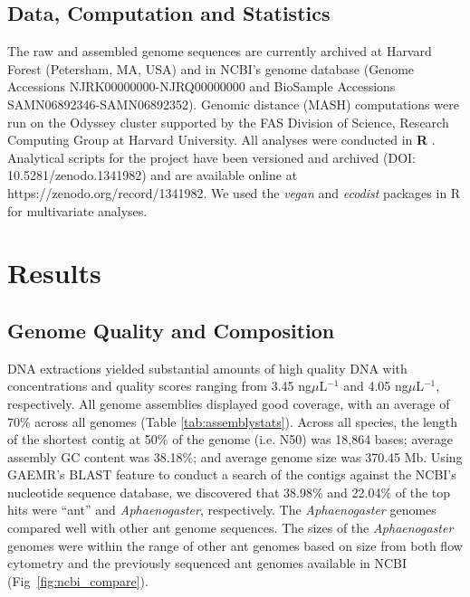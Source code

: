 \documentclass[fleqn,10pt,lineno]{wlpeerj} %
\begin{document}
\subsection*{Data, Computation and Statistics}

The raw and assembled genome sequences are currently archived at
Harvard Forest (Petersham, MA, USA) and in NCBI's genome database
(Genome Accessions NJRK00000000-NJRQ00000000 and BioSample Accessions
SAMN06892346-SAMN06892352). Genomic distance (MASH) computations were
run on the Odyssey cluster supported by the FAS Division of Science,
Research Computing Group at Harvard University. All analyses were
conducted in \textbf{R} \citep{RCoreTeam2017}. Analytical scripts for
the project have been versioned and archived (DOI:
10.5281/zenodo.1341982) and are available online at
https://zenodo.org/record/1341982. We used the \textit{vegan}
\citep{Oksanen2016} and \textit{ecodist} \citep{Goslee2007} packages
in R for multivariate analyses.

\section*{Results}

\subsection*{Genome Quality and Composition}

DNA extractions yielded substantial amounts of high quality DNA with
concentrations and quality scores ranging from 3.45
ng$\mu$L$^{-1}$ and 4.05 ng$\mu$L$^{-1}$,
respectively. All genome assemblies displayed good coverage, with an
average of 70\% across all genomes (Table
\ref{tab:assemblystats}). Across all species, the length of the
shortest contig at 50\% of the genome (i.e. N50) was 18,864 bases;
average assembly GC content was 38.18\%; and average genome size was
370.45 Mb.  Using GAEMR's BLAST feature to conduct a search of the
contigs against the NCBI's nucleotide sequence database, we discovered
that 38.98\% and 22.04\% of the top hits were ``ant'' and
\textit{Aphaenogaster}, respectively. The \textit{Aphaenogaster}
genomes compared well with other ant genome sequences. The sizes of
the \textit{Aphaenogaster} genomes were within the range of other ant
genomes based on size from both flow cytometry \citep{Tsutsui2008a}
and the previously sequenced ant genomes available in NCBI
(Fig~\ref{fig:ncbi_compare}).



\end{document}
